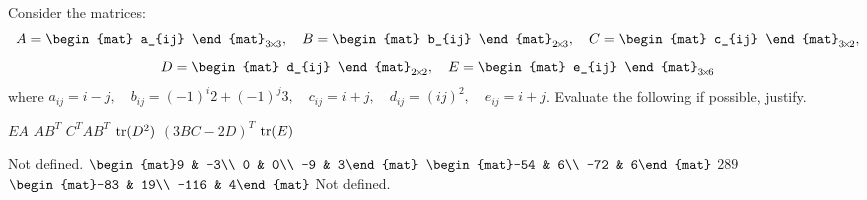 
\begin{Exercise}[
name={},
title={}, 
difficulty=0,
origin={\cite{YL}}]
Consider the matrices:
\[
A=
\begin{mat}
a_{ij}
\end{mat}_{\nbyn{3}},\quad
B=
\begin{mat}
b_{ij}
\end{mat}_{\nbym{2}{3}},\quad
C=
\begin{mat}
c_{ij}
\end{mat}_{\nbym{3}{2}},
\]
\[
D=
\begin{mat}
d_{ij}
\end{mat}_{\nbyn{2}},\quad
E=
\begin{mat}
e_{ij}
\end{mat}_{\nbym{3}{6}}
\]
where $a_{ij}=i-j,\quad b_{ij}=(-1)^i2+(-1)^j3,\quad c_{ij}=i+j,\quad d_{ij}=(ij)^2,\quad e_{ij}=i+j$.  Evaluate the following if possible, justify.
\begin{multicols}{3}
\Question $EA$
\Question $AB^T$
\Question $C^TAB^T$
\Question $\operatorname{tr}(D^2)$
\Question $(3BC-2D)^T$
\Question $\operatorname{tr}(E)$
\EndCurrentQuestion
\end{multicols}
\end{Exercise}

\begin{Answer}
\Question Not defined.
\Question $\begin{mat}9 & -3\\ 0 & 0\\ -9 & 3\end{mat}$
\Question $\begin{mat}-54 & 6\\ -72 & 6\end{mat}$
\Question $289$
\Question $\begin{mat}-83 & 19\\ -116 & 4\end{mat}$
\Question Not defined.
\end{Answer}
